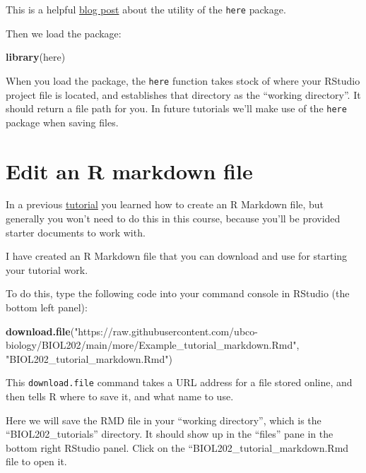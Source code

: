 \documentclass[
]{book}
\newenvironment{Shaded}{\begin{snugshade}}{\end{snugshade}}
\newcommand{\FunctionTok}[1]{\textcolor[rgb]{0.13,0.29,0.53}{\textbf{#1}}}
\newcommand{\NormalTok}[1]{#1}
\newcommand{\StringTok}[1]{\textcolor[rgb]{0.31,0.60,0.02}{#1}}
\begin{document}
This is a helpful \href{http://jenrichmond.rbind.io/post/how-to-use-the-here-package/}{blog post} about the utility of the \texttt{here} package.

Then we load the package:

\begin{Shaded}
\begin{Highlighting}[]
\FunctionTok{library}\NormalTok{(here)}
\end{Highlighting}
\end{Shaded}

When you load the package, the \texttt{here} function takes stock of where your RStudio project file is located, and establishes that directory as the ``working directory''. It should return a file path for you. In future tutorials we'll make use of the \texttt{here} package when saving files.

\section{Edit an R markdown file}\label{edit_markdown}

In a previous \hyperref[intro_markdown]{tutorial} you learned how to create an R Markdown file, but generally you won't need to do this in this course, because you'll be provided starter documents to work with.

I have created an R Markdown file that you can download and use for starting your tutorial work.

To do this, type the following code into your command console in RStudio (the bottom left panel):

\begin{Shaded}
\begin{Highlighting}[]
\FunctionTok{download.file}\NormalTok{(}\StringTok{"https://raw.githubusercontent.com/ubco{-}biology/BIOL202/main/more/Example\_tutorial\_markdown.Rmd"}\NormalTok{, }\StringTok{"BIOL202\_tutorial\_markdown.Rmd"}\NormalTok{)}
\end{Highlighting}
\end{Shaded}

This \texttt{download.file} command takes a URL address for a file stored online, and then tells R where to save it, and what name to use.

Here we will save the RMD file in your ``working directory'', which is the ``BIOL202\_tutorials'' directory. It should show up in the ``files'' pane in the bottom right RStudio panel. Click on the ``BIOL202\_tutorial\_markdown.Rmd file to open it.
\end{document}
